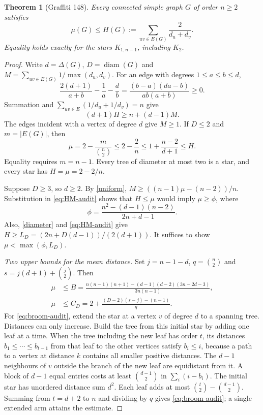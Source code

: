 \documentclass[11pt,a4paper]{article}
\newtheorem{theorem}{Theorem}[section]
\theoremstyle{remark}\newtheorem*{remark}{Remark}
\begin{document}
\begin{theorem}[Graffiti 148]\label{thm:harmonic}
Every connected simple graph $G$ of order $n\ge2$ satisfies
\[
 \mu(G)\le H(G):=\sum_{uv\in E(G)}\frac{2}{d_u+d_v}.
\]
Equality holds exactly for the stars $K_{1,n-1}$, including $K_2$.
\end{theorem}

\begin{proof}
Write $d=\Delta(G)$, $D=\operatorname{diam}(G)$ and $M=\sum_{uv\in E(G)}1/\max(d_u,d_v)$. For an edge with degrees $1\le a\le b\le d$,
\[
 \frac{2(d+1)}{a+b}-\frac1a-\frac d b
 =\frac{(b-a)(da-b)}{ab(a+b)}\ge0.
\]
Summation and $\sum_{uv\in E}(1/d_u+1/d_v)=n$ give
\begin{equation}\label{eq:HM-audit}
 (d+1)H\ge n+(d-1)M.
\end{equation}
The edges incident with a vertex of degree $d$ give $M\ge1$. If $D\le2$ and $m=|E(G)|$, then
\[
 \mu=2-\frac{m}{\binom n2}\le 2-\frac2n
 \le 1+\frac{n-2}{d+1}\le H.
\]
Equality requires $m=n-1$. Every tree of diameter at most two is a star, and every star has $H=\mu=2-2/n$.

Suppose $D\ge3$, so $d\ge2$. By \eqref{uniform}, $M\ge ((n-1)\mu-(n-2))/n$. Substitution in \eqref{eq:HM-audit} shows that $H\le\mu$ would imply $\mu\ge\phi$, where
\[
 \phi=\frac{n^2-(d-1)(n-2)}{2n+d-1}.
\]
Also, \eqref{diameter} and \eqref{eq:HM-audit} give $H\ge L_D=(2n+D(d-1))/(2(d+1))$. It suffices to show $\mu<\max(\phi,L_D)$.

\smallskip\noindent\emph{Two upper bounds for the mean distance.}
Set $j=n-1-d$, $q=\binom n2$ and $s=j(d+1)+\binom j2$. Then
\begin{align}
 \mu &\le B=\frac{n(n-1)(n+1)-(d-1)(d-2)(3n-2d-3)}{3n(n-1)},\label{eq:broom-audit}\\
 \mu &\le C_D=2+\frac{(D-2)(s-j)-(n-1)}q.\label{eq:hub-audit}
\end{align}
For \eqref{eq:broom-audit}, extend the star at a vertex $v$ of degree $d$ to a spanning tree. Distances can only increase. Build the tree from this initial star by adding one leaf at a time. When the tree including the new leaf has order $t$, its distances $b_1\le\cdots\le b_{t-1}$ from that leaf to the other vertices satisfy $b_i\le i$, because a path to a vertex at distance $k$ contains all smaller positive distances. The $d-1$ neighbours of $v$ outside the branch of the new leaf are equidistant from it. A block of $d-1$ equal entries costs at least $\binom{d-1}{2}$ in $\sum_i(i-b_i)$. The initial star has unordered distance sum $d^2$. Each leaf adds at most $\binom t2-\binom{d-1}{2}$. Summing from $t=d+2$ to $n$ and dividing by $q$ gives \eqref{eq:broom-audit}; a single extended arm attains the estimate.


\end{proof}
\end{document}
